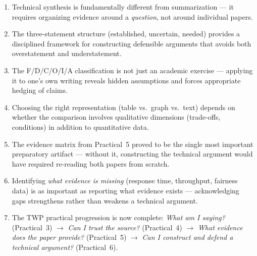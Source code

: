 \documentclass[11pt, a4paper]{article}
\begin{document}
\begin{enumerate}[nosep]
    \item Technical synthesis is fundamentally different from summarization --- it requires organizing evidence around a \emph{question}, not around individual papers.

    \item The three-statement structure (established, uncertain, needed) provides a disciplined framework for constructing defensible arguments that avoids both overstatement and understatement.

    \item The F/D/C/O/I/A classification is not just an academic exercise --- applying it to one's own writing reveals hidden assumptions and forces appropriate hedging of claims.

    \item Choosing the right representation (table vs.\ graph vs.\ text) depends on whether the comparison involves qualitative dimensions (trade-offs, conditions) in addition to quantitative data.

    \item The evidence matrix from Practical~5 proved to be the single most important preparatory artifact --- without it, constructing the technical argument would have required re-reading both papers from scratch.

    \item Identifying \emph{what evidence is missing} (response time, throughput, fairness data) is as important as reporting what evidence exists --- acknowledging gaps strengthens rather than weakens a technical argument.

    \item The TWP practical progression is now complete: \textit{What am I saying?} (Practical~3) $\rightarrow$ \textit{Can I trust the source?} (Practical~4) $\rightarrow$ \textit{What evidence does the paper provide?} (Practical~5) $\rightarrow$ \textit{Can I construct and defend a technical argument?} (Practical~6).
\end{enumerate}
\end{document}
